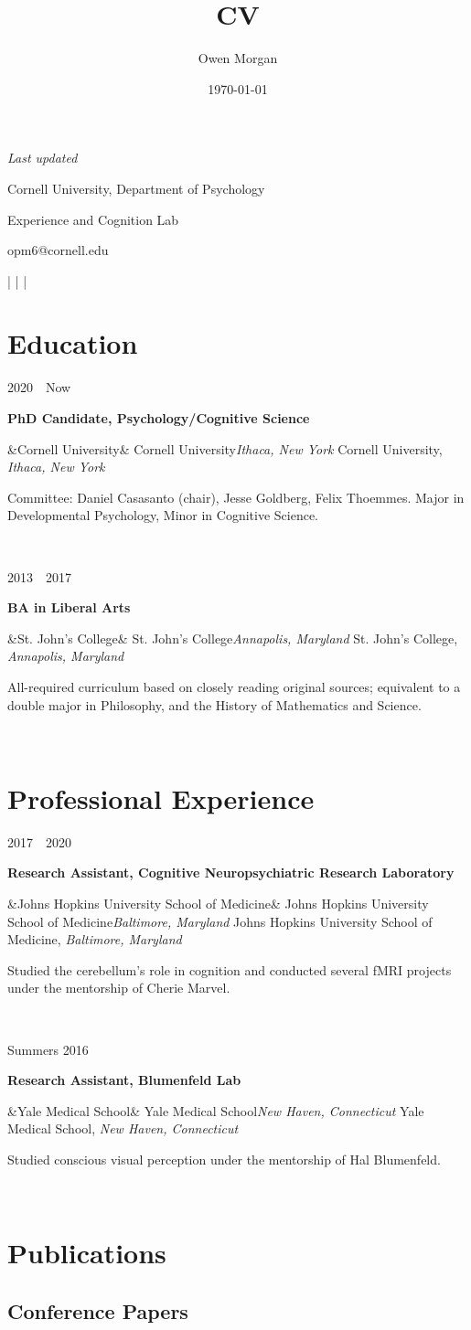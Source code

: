 \documentclass{article}
\author{Owen Morgan}
\title{CV}
\date{\today}
\makeatletter
\newcommand{\entry}[5]{

  \begin{minipage}[t]{.15\textwidth}
    \begin{flushright}
      \hfill {#1}
    \end{flushright}
  \end{minipage}
  \hfill\vline\hfill
  \begin{minipage}[t]{.80\textwidth}
    \textbf{#2}

    \ifx&#3&
      {#3}\textit{#4}
    \else
      {#3, }\textit{#4}

    \fi
    \footnotesize{#5}
  \end{minipage}\\\vspace{.25cm}
}
\newcommand{\cu}{Cornell University}
\newcommand{\sjc}{St. John's College}
\newcommand{\jhusom}{Johns Hopkins University School of Medicine}
\let\oldhref\href
\renewcommand{\href}[3][blue]{\oldhref{#2}{\color{#1}{#3}}}
\renewcommand{\maketitle}{
  \begin{minipage}[t]{.5\textwidth}
    \begin{flushleft}
      \textit{Last updated \thedate}
    \end{flushleft}
  \end{minipage}
  \begin{minipage}[t]{.5\textwidth}
    \begin{flushright}
      {\huge\bfseries
      \theauthor}

      \vspace{.25em}

      \cu, Department of Psychology

      Experience and Cognition Lab

      opm6@cornell.edu

     \href{https://scholar.google.com/citations?user=srf5UFkAAAAJ&hl=en&oi=ao}{Google Scholar} | \href{https://github.com/opmorgan}{Github} | \href{https://orcid.org/0000-0003-3284-9909}{ORCiD} | \href{https://opmorgan.com}{opmorgan.com}

    \end{flushright}
  \end{minipage}
}
\makeatother
\begin{document}
\maketitle

\section{Education}

\entry
{2020~\textendash~Now}
{PhD Candidate, Psychology/Cognitive Science}
{\cu}{Ithaca, New York}
{Committee: Daniel Casasanto (chair), Jesse Goldberg, Felix Thoemmes. Major in Developmental Psychology, Minor in Cognitive Science.}

\entry
{2013~\textendash~2017}
{BA in Liberal Arts}
{\sjc}{Annapolis, Maryland}
{All-required curriculum based on closely reading original sources; equivalent to a double major in Philosophy, and the History of Mathematics and Science.}

\section{Professional Experience}

\entry
{2017~\textendash~2020}
{Research Assistant, Cognitive Neuropsychiatric Research Laboratory}
{\jhusom}{Baltimore, Maryland}
{Studied the cerebellum’s role in cognition and conducted several fMRI projects under the mentorship of Cherie Marvel.}

\entry
{Summers 2016 }
{Research Assistant, Blumenfeld Lab}
{Yale Medical School}{New Haven, Connecticut}
{Studied conscious visual perception under the mentorship of Hal Blumenfeld.}

\section{Publications}



\subsection{Conference Papers}
\nocite{*}
\printbibliography[heading=none]
\end{document}
